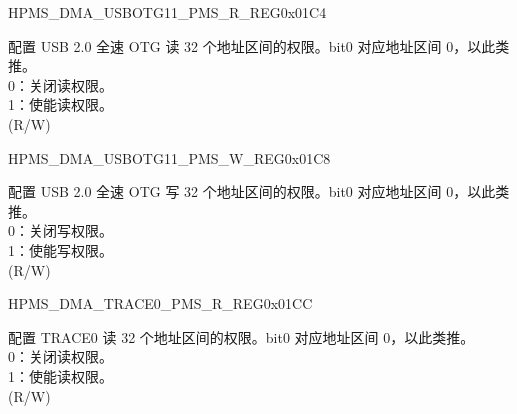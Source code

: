 \begin{register}{H}{PMS\_DMA\_USBOTG11\_PMS\_R\_REG}{0x01C4}\label{regdesc:PMSDMAUSBOTG11PMSRREG}
%
\regnewline%
\begin{regdesc}\begin{reglist}
\label{fielddesc:PMSDMAUSBOTG11RPMS}\item [PMS\_DMA\_USBOTG11\_R\_PMS] 配置 USB 2.0 全速 OTG 读 32 个地址区间的权限。bit0 对应地址区间 0，以此类推。\\
0：关闭读权限。\\
1：使能读权限。\\ (R/W)
\end{reglist}\end{regdesc}
\end{register}


\begin{register}{H}{PMS\_DMA\_USBOTG11\_PMS\_W\_REG}{0x01C8}\label{regdesc:PMSDMAUSBOTG11PMSWREG}
%
\regnewline%
\begin{regdesc}\begin{reglist}
\label{fielddesc:PMSDMAUSBOTG11WPMS}\item [PMS\_DMA\_USBOTG11\_W\_PMS] 配置 USB 2.0 全速 OTG 写 32 个地址区间的权限。bit0 对应地址区间 0，以此类推。\\
0：关闭写权限。\\
1：使能写权限。\\ (R/W)
\end{reglist}\end{regdesc}
\end{register}


\begin{register}{H}{PMS\_DMA\_TRACE0\_PMS\_R\_REG}{0x01CC}\label{regdesc:PMSDMATRACE0PMSRREG}
%
\regnewline%
\begin{regdesc}\begin{reglist}
\label{fielddesc:PMSDMATRACE0RPMS}\item [PMS\_DMA\_TRACE0\_R\_PMS] 配置 TRACE0 读 32 个地址区间的权限。bit0 对应地址区间 0，以此类推。\\
0：关闭读权限。\\
1：使能读权限。\\ (R/W)
\end{reglist}\end{regdesc}
\end{register}


